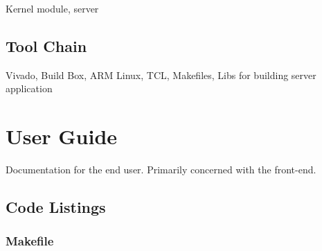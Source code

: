 \documentclass[a4paper,oneside]{alpenthesis/alpenthesis}
\begin{document}
Kernel module, server


\chapter{Tool Chain} %
\label{ch:Tool_Chain}
Vivado, Build Box, ARM Linux, TCL, Makefiles, Libs for building server application



\part{User Guide} %
\label{part:User_Guide}
Documentation  for the  end user. Primarily  concerned with  the 
front-end.


\cleardoublepage %
\begin{titlingpage*}
    \begin{vplace}
        \flushright\Huge\bfseries\sffamily\appendixpagename
    \end{vplace}
\end{titlingpage*}
\appendix
{}


\chapter{Code Listings}
\label{ch:Code_Listings}

\section{Makefile}
\begin{tcolorbox}[
        breakable,
        title={
            \refstepcounter{listing}
            Listing \thelisting: Makefile Code
            \label{lst:makefile}
            \addcontentsline{lol}{listing}{\protect\numberline{\thelisting}Makefile Code}
        }
    ]
    \inputminted{makefile}{code/Makefile}
\end{tcolorbox}
\end{document}

